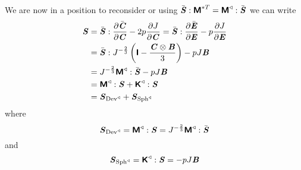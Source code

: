 We are now in a position to reconsider  or  \ie
using
$ \bar{\boldsymbol{\mathit{S}}} : \boldsymbol{\mathsf{M}}^{*T} =  \boldsymbol{\mathsf{M}}^{\triangleleft}  : \bar{\boldsymbol{\mathit{S}}} $
we can write
\begin{equation}
  \begin{split}
    \boldsymbol{\mathit{S}}&= \bar{\boldsymbol{\mathit{S}}} :  \dfrac{\partial \bar{\boldsymbol{\mathit{C}}}}{\partial \boldsymbol{\mathit{C}}}  -2p \dfrac{\partial J}{\partial \boldsymbol{\mathit{C}}} =
     \bar{\boldsymbol{\mathit{S}}} :  \dfrac{\partial \bar{\boldsymbol{\mathit{E}}}}{\partial \boldsymbol{\mathit{E}}}  -p \dfrac{\partial J}{\partial \boldsymbol{\mathit{E}}} \\
    &=
     \bar{\boldsymbol{\mathit{S}}} :  J^{-\frac{2}{3}}\left( \boldsymbol{\mathsf{I}}-\dfrac{ \boldsymbol{\mathit{C}} \otimes \boldsymbol{\mathit{B}} }{3} \right) -pJ\boldsymbol{\mathit{B}}\\
    &=J^{-\frac{2}{3}}  \boldsymbol{\mathsf{M}}^{\triangleleft}  : \bar{\boldsymbol{\mathit{S}}} -pJ\boldsymbol{\mathit{B}}\\
    &=  \boldsymbol{\mathsf{M}}^{\triangleleft}  : \boldsymbol{\mathit{S}} +  \boldsymbol{\mathsf{K}}^{\triangleleft}  : \boldsymbol{\mathit{S}} \\
    &=\boldsymbol{\mathit{S}}_{ \operatorname{Dev}^{\triangleleft} }+\boldsymbol{\mathit{S}}_{ \operatorname{Sph}^{\triangleleft} }
  \end{split}
\end{equation}
where
\begin{equation}
  \boldsymbol{\mathit{S}}_{ \operatorname{Dev}^{\triangleleft} }=  \boldsymbol{\mathsf{M}}^{\triangleleft}  : \boldsymbol{\mathit{S}} =J^{-\frac{2}{3}}  \boldsymbol{\mathsf{M}}^{\triangleleft}  : \bar{\boldsymbol{\mathit{S}}} 
\end{equation}
and
\begin{equation}
  \boldsymbol{\mathit{S}}_{ \operatorname{Sph}^{\triangleleft} }=  \boldsymbol{\mathsf{K}}^{\triangleleft}  : \boldsymbol{\mathit{S}} =-pJ\boldsymbol{\mathit{B}}
\end{equation}

